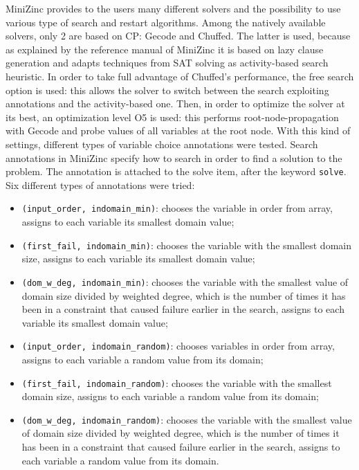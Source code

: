 \documentclass[a4paper, 12pt]{article}
\begin{document}
MiniZinc provides to the users many different solvers and the possibility to use various type of search and restart algorithms. Among the natively available solvers, only 2 are based on CP: Gecode and Chuffed. The latter is used, because as explained by the reference manual of MiniZinc it is based on lazy clause generation and adapts techniques from SAT solving as activity-based search heuristic. In order to take full advantage of Chuffed’s performance, the free search option is used: this allows the solver to switch between the search exploiting annotations and the activity-based one. Then, in order to optimize the solver at its best, an optimization level O5 is used: this performs root-node-propagation with Gecode and probe values of all variables at the root node. With this kind of settings, different types of variable choice annotations were tested. Search annotations in MiniZinc specify how to search in order to find a solution to the problem. The annotation is attached to the solve item, after the keyword \verb|solve|. Six different types of annotations were tried:
\begin{itemize}
    \item \verb|(input_order, indomain_min)|: chooses the variable in order from array, assigns to each variable its smallest domain value;
    \item \verb|(first_fail, indomain_min)|: chooses the variable with the smallest domain size, assigns to each variable its smallest domain value;
    \item \verb|(dom_w_deg, indomain_min)|: chooses the variable with the smallest value of domain size divided by weighted degree, which is the number of times it has been in a constraint that caused failure earlier in the search, assigns to each variable its smallest domain value;
    \item \verb|(input_order, indomain_random)|: chooses variables in order from array, assigns to each variable a random value from its domain;
    \item \verb|(first_fail, indomain_random)|: chooses the variable with the smallest domain size, assigns to each variable a random value from its domain;
    \item \verb|(dom_w_deg, indomain_random)|: chooses the variable with the smallest value of domain size divided by weighted degree, which is the number of times it has been in a constraint that caused failure earlier in the search, assigns to each variable a random value from its domain.
\end{itemize}
\end{document}
